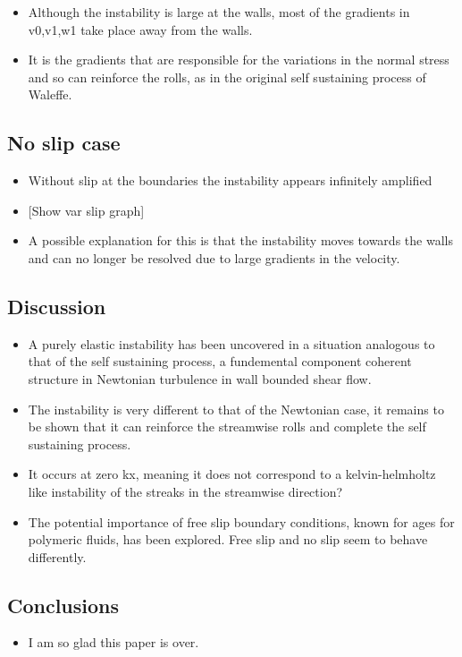 \begin{itemize}
\itemsep1pt\parskip0pt
\item
  Although the instability is large at the walls, most of the gradients
  in v0,v1,w1 take place away from the walls.
\item
  It is the gradients that are responsible for the variations in the
  normal stress and so can reinforce the rolls, as in the original self
  sustaining process of Waleffe.
\end{itemize}

\subsection{No slip case}\label{no-slip-case}

\begin{itemize}
\itemsep1pt\parskip0pt
\item
  Without slip at the boundaries the instability appears infinitely
  amplified
\item
  {[}Show var slip graph{]}
\item
  A possible explanation for this is that the instability moves towards
  the walls and can no longer be resolved due to large gradients in the
  velocity.
\end{itemize}

\subsection{Discussion}\label{discussion}

\begin{itemize}
\itemsep1pt\parskip0pt
\item
  A purely elastic instability has been uncovered in a situation
  analogous to that of the self sustaining process, a fundemental
  component coherent structure in Newtonian turbulence in wall bounded
  shear flow.
\item
  The instability is very different to that of the Newtonian case, it
  remains to be shown that it can reinforce the streamwise rolls and
  complete the self sustaining process.
\item
  It occurs at zero kx, meaning it does not correspond to a
  kelvin-helmholtz like instability of the streaks in the streamwise
  direction?
\item
  The potential importance of free slip boundary conditions, known for
  ages for polymeric fluids, has been explored. Free slip and no slip
  seem to behave differently.
\end{itemize}

\subsection{Conclusions}\label{conclusions}

\begin{itemize}
\itemsep1pt\parskip0pt
\item
  I am so glad this paper is over.
\end{itemize}
